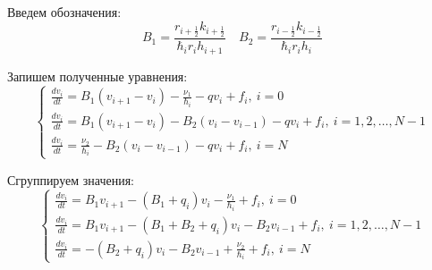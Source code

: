 Введем обозначения:
\[
  B_1 =\frac{r_{i + \frac{1}{2}} k_{i + \frac{1}{2}}}{\hbar_i r_i h_{i + 1}} 
  \quad B_2 = \frac{r_{i - \frac{1}{2}} k_{i - \frac{1}{2}}}{\hbar_i r_i h_{i}}
\]

Запишем полученные уравнения:
\[
  \begin{cases}
    \frac{d v_i}{dt} = B_1 (v_{i+1}-v_i)
    - \frac{\nu_1}{\hbar_i} - q v_i + f_i,\ i = 0 \\

    \frac{d v_i}{dt} = B_1 (v_{i+1}-v_i)
    - B_2 (v_{i}-v_{i-1}) - q v_i + f_i,\ i = 1, 2, \dots, N-1 \\

    \frac{d v_i}{dt} = \frac{\nu_2}{\hbar_i}
  - B_2 (v_{i}-v_{i-1}) - q v_i + f_i,\ i = N
  \end{cases}
\]

Сгруппируем значения:
\[
  \begin{cases}
    \frac{d v_i}{dt} = B_1 v_{i+1} - (B_1 + q_i) v_i - \frac{\nu_1}{\hbar_i} + f_i,\ i=0 \\
    \frac{d v_i}{dt} = B_1 v_{i+1} - (B_1 + B_2 + q_i) v_i - B_2 v_{i - 1} + f_i,\ i = 1, 2,\dots, N-1\\
    \frac{d v_i}{dt} = -(B_2 + q_i)v_i - B_2 v_{i - 1} + \frac{\nu_2}{\hbar_i} + f_i,\ i = N
  \end{cases}
\]

